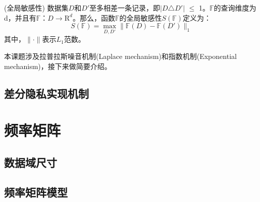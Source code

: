 \begin{defn}
	(\textsc{全局敏感性}\cite{Dwork Calibrating}) 数据集$D$和$D'$至多相差一条记录，即$|D$$\triangle$$D'|$ $\leqslant$ 1。$\mathbb{F}$的查询维度为d，并且有$\mathbb{F}$：$D \rightarrow \mathrm{R}^d$。那么，函数$\mathbb{F}$的全局敏感性$S(\mathbb{F})$定义为：
\begin{equation}

	S(\mathbb{F}) = \max \limits_{D,D'} \| \mathbb{F}(D) - \mathbb{F}(D') \|_{1}
\end{equation}
其中，$\|\cdot\|$表示$L_{1}$范数。
\end{defn}

本课题涉及拉普拉斯噪音机制(Laplace mechanism)和指数机制(Exponential mechanism)，接下来做简要介绍。

\subsection{差分隐私实现机制}

\section{频率矩阵}

\subsection{数据域尺寸}

\subsection{频率矩阵模型}
